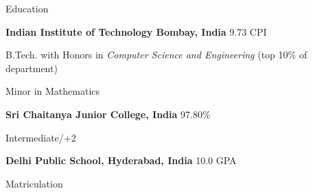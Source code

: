 \begin{rubric}{Education}

\entry*[2019 -- 2022*]%
	\textbf{Indian Institute of Technology Bombay, India} \hfill 9.73 CPI
	\par B.Tech. with Honors in \emph{Computer Science and Engineering} \hfill (top 10\% of department)
	\par Minor in Mathematics


\entry*[2017 -- 2019]%
	\textbf{Sri Chaitanya Junior College, India} \hfill 97.80\% \par
	Intermediate/+2
	

\entry*[2010 -- 2017]%
	\textbf{Delhi Public School, Hyderabad, India} \hfill 10.0 GPA \par
	Matriculation
\end{rubric}